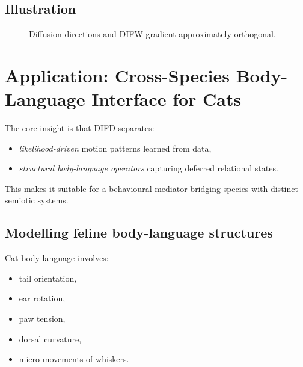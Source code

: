 \documentclass[11pt]{article}
\begin{document}
\subsection{Illustration}

\begin{figure}[h]
\centering
{}
\caption{Diffusion directions and DIFW gradient approximately orthogonal.}
\end{figure}

\section{Application: Cross-Species Body-Language Interface for Cats}

The core insight is that DIFD separates:
\begin{itemize}
    \item \emph{likelihood-driven} motion patterns learned from data,
    \item \emph{structural body-language operators} capturing deferred relational states.
\end{itemize}

This makes it suitable for a behavioural mediator bridging species with distinct
semiotic systems.

\subsection{Modelling feline body-language structures}

Cat body language involves:
\begin{itemize}[itemsep=3pt]
    \item tail orientation,
    \item ear rotation,
    \item paw tension,
    \item dorsal curvature,
    \item micro-movements of whiskers.
\end{itemize}
\end{document}
